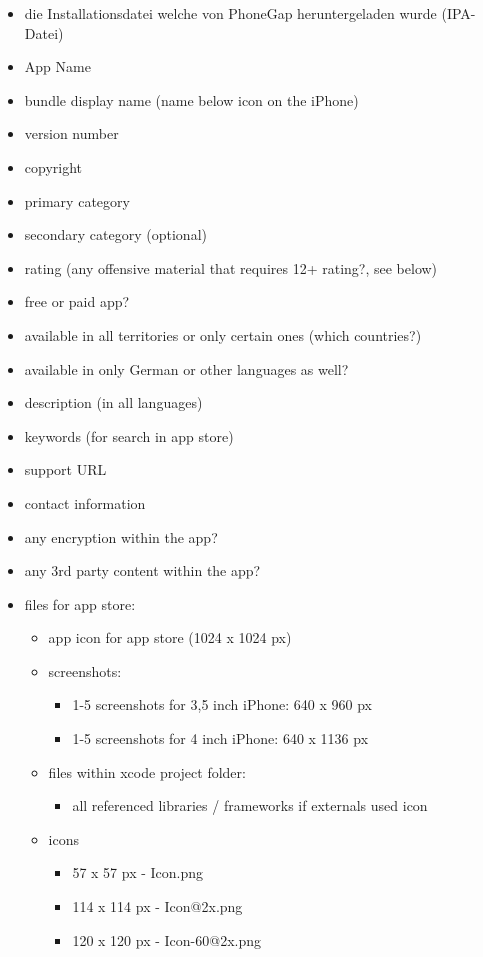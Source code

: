 \begin{itemize}
\item die Installationsdatei welche von PhoneGap heruntergeladen wurde (IPA-Datei)
\item App Name
\item bundle display name (name below icon on the iPhone)
\item version number
\item copyright
\item primary category
\item secondary category (optional)
\item rating (any offensive material that requires 12+ rating?, see below)
\item free or paid app?
\item available in all territories or only certain ones (which countries?)
\item available in only German or other languages as well?
\item description (in all languages)
\item keywords (for search in app store)
\item support URL
\item contact information
\item any encryption within the app?
\item any 3rd party content within the app?
\item files for app store:
	\begin{itemize}
		\item app icon for app store (1024 x 1024 px)
		\item screenshots:
			\begin{itemize}
				\item 1-5 screenshots for 3,5 inch iPhone: 640 x 960 px
				\item 1-5 screenshots for 4 inch iPhone: 640 x 1136 px
			\end{itemize}
		\item files within xcode project folder:
			\begin{itemize}
				\item all referenced libraries / frameworks if externals used icon
			\end{itemize}
		\item icons
			\begin{itemize}
				\item 57 x 57 px - Icon.png
				\item 114 x 114 px - Icon@2x.png
				\item 120 x 120 px - Icon-60@2x.png

\end{itemize}
\end{itemize}
\end{itemize}
